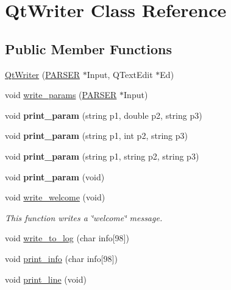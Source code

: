 \hypertarget{classQtWriter}{
\section{QtWriter Class Reference}
\label{classQtWriter}
}
\subsection*{Public Member Functions}
\begin{DoxyCompactItemize}
\item 
\hyperlink{classQtWriter_abb998468e7003961ae81e1738c3afffc}{QtWriter} (\hyperlink{classPARSER}{PARSER} $\ast$Input, QTextEdit $\ast$Ed)
\item 
void \hyperlink{classQtWriter_aeaba3939272a4c6a5a103d493a1de7e4}{write\_\-params} (\hyperlink{classPARSER}{PARSER} $\ast$Input)
\item 
\hypertarget{classQtWriter_a65ba17918ae991ecd38d8c8175507ef1}{
void {\bfseries print\_\-param} (string p1, double p2, string p3)}
\label{classQtWriter_a65ba17918ae991ecd38d8c8175507ef1}

\item 
\hypertarget{classQtWriter_afbe17e778f54aa1748a04ffe54280310}{
void {\bfseries print\_\-param} (string p1, int p2, string p3)}
\label{classQtWriter_afbe17e778f54aa1748a04ffe54280310}

\item 
\hypertarget{classQtWriter_ab095042427ff3ef5d3595983733a665b}{
void {\bfseries print\_\-param} (string p1, string p2, string p3)}
\label{classQtWriter_ab095042427ff3ef5d3595983733a665b}

\item 
\hypertarget{classQtWriter_a670491eaff62a22d33ea2a1877ee557e}{
void {\bfseries print\_\-param} (void)}
\label{classQtWriter_a670491eaff62a22d33ea2a1877ee557e}

\item 
\hypertarget{classQtWriter_a22835ce6f128702a1590381c2663e2a2}{
void \hyperlink{classQtWriter_a22835ce6f128702a1590381c2663e2a2}{write\_\-welcome} (void)}
\label{classQtWriter_a22835ce6f128702a1590381c2663e2a2}

\begin{DoxyCompactList}\small\item\em This function writes a \char`\"{}welcome\char`\"{} message. \item\end{DoxyCompactList}\item 
void \hyperlink{classQtWriter_a99f6265ac316c3a98bc295bcfb44485a}{write\_\-to\_\-log} (char info\mbox{[}98\mbox{]})
\item 
void \hyperlink{classQtWriter_add3a6572744ffda956d733a0b64c7177}{print\_\-info} (char info\mbox{[}98\mbox{]})
\item 
\hypertarget{classQtWriter_a6c3cd191398830da1a3a3bcbc3afa2a5}{
void \hyperlink{classQtWriter_a6c3cd191398830da1a3a3bcbc3afa2a5}{print\_\-line} (void)}
\label{classQtWriter_a6c3cd191398830da1a3a3bcbc3afa2a5}


\end{DoxyCompactItemize}
